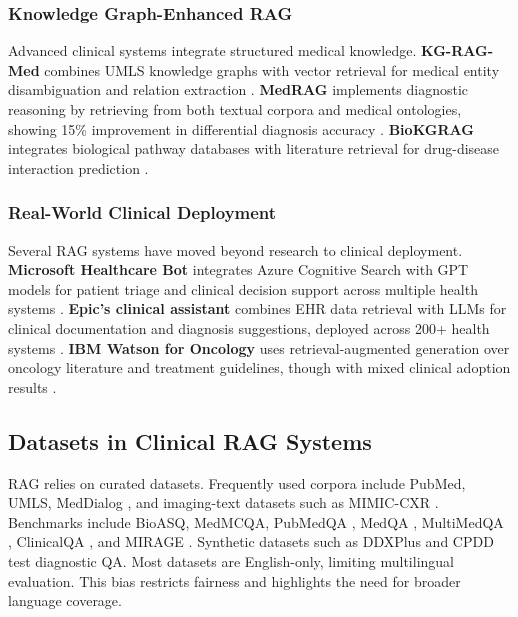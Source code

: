 \subsubsection{Knowledge Graph-Enhanced RAG}
Advanced clinical systems integrate structured medical knowledge. \textbf{KG-RAG-Med} combines UMLS knowledge graphs with vector retrieval for medical entity disambiguation and relation extraction \citep{yasunaga2023kgragmed}. \textbf{MedRAG} implements diagnostic reasoning by retrieving from both textual corpora and medical ontologies, showing 15\% improvement in differential diagnosis accuracy \citep{xiong2024medrag}. \textbf{BioKGRAG} integrates biological pathway databases with literature retrieval for drug-disease interaction prediction \citep{wang2024biokgrag}.

\subsubsection{Real-World Clinical Deployment}
Several RAG systems have moved beyond research to clinical deployment. \textbf{Microsoft Healthcare Bot} integrates Azure Cognitive Search with GPT models for patient triage and clinical decision support across multiple health systems \citep{microsoft2024healthcare}. \textbf{Epic's clinical assistant} combines EHR data retrieval with LLMs for clinical documentation and diagnosis suggestions, deployed across 200+ health systems \citep{epic2024rag}. \textbf{IBM Watson for Oncology} uses retrieval-augmented generation over oncology literature and treatment guidelines, though with mixed clinical adoption results \citep{somashekhar2018watson}.

\subsection{Datasets in Clinical RAG Systems}

RAG relies on curated datasets. Frequently used corpora include PubMed, UMLS, MedDialog \citep{zeng2020meddialog}, and imaging-text datasets such as MIMIC-CXR \citep{johnson2019mimiccxr}. Benchmarks include BioASQ, MedMCQA, PubMedQA \citep{jin2019pubmedqa}, MedQA \citep{jin2021medqa}, MultiMedQA \citep{singhal2023multimedqa}, ClinicalQA \citep{abacha2017nlmclinicalqa}, and MIRAGE \citep{zhu2023mirage}. Synthetic datasets such as DDXPlus \citep{liu2023ddxplus} and CPDD \citep{zhao2025medrag} test diagnostic QA.
Most datasets are English-only, limiting multilingual evaluation. This bias restricts fairness and highlights the need for broader language coverage.

